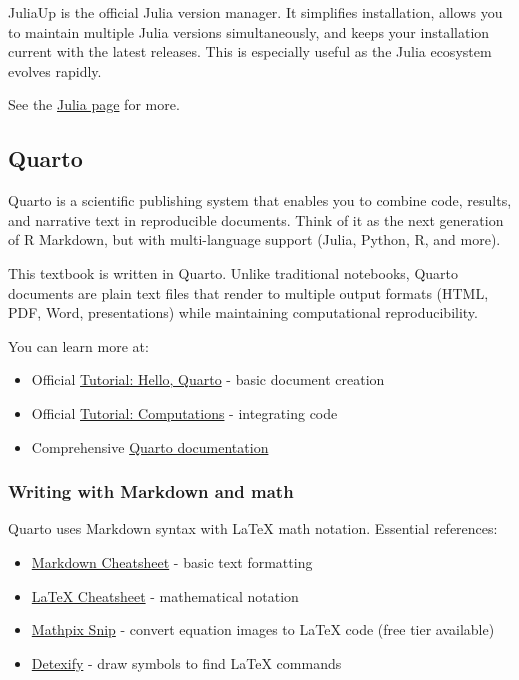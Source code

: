\documentclass[
  letterpaper,
  DIV=11,
  numbers=noendperiod]{scrreprt}
\providecommand{\tightlist}{%
  \setlength{\itemsep}{0pt}\setlength{\parskip}{0pt}}
\begin{document}
JuliaUp is the official Julia version manager. It simplifies
installation, allows you to maintain multiple Julia versions
simultaneously, and keeps your installation current with the latest
releases. This is especially useful as the Julia ecosystem evolves
rapidly.

See the \href{./julia.qmd}{Julia page} for more.

\subsection{Quarto}\label{quarto}

Quarto is a scientific publishing system that enables you to combine
code, results, and narrative text in reproducible documents. Think of it
as the next generation of R Markdown, but with multi-language support
(Julia, Python, R, and more).

This textbook is written in Quarto. Unlike traditional notebooks, Quarto
documents are plain text files that render to multiple output formats
(HTML, PDF, Word, presentations) while maintaining computational
reproducibility.

You can learn more at:

\begin{itemize}
\tightlist
\item
  Official
  \href{https://quarto.org/docs/get-started/hello/vscode.html}{Tutorial:
  Hello, Quarto} - basic document creation
\item
  Official
  \href{https://quarto.org/docs/get-started/computations/vscode.html}{Tutorial:
  Computations} - integrating code
\item
  Comprehensive \href{https://quarto.org/docs/guide/}{Quarto
  documentation}
\end{itemize}

\subsubsection{Writing with Markdown and
math}\label{writing-with-markdown-and-math}

Quarto uses Markdown syntax with LaTeX math notation. Essential
references:

\begin{itemize}
\tightlist
\item
  \href{https://www.markdownguide.org/cheat-sheet/}{Markdown Cheatsheet}
  - basic text formatting
\item
  \href{https://ctan.math.washington.edu/tex-archive/info/undergradmath/undergradmath.pdf}{LaTeX
  Cheatsheet} - mathematical notation
\item
  \href{https://mathpix.com/snip}{Mathpix Snip} - convert equation
  images to LaTeX code (free tier available)
\item
  \href{https://detexify.kirelabs.org/classify.html}{Detexify} - draw
  symbols to find LaTeX commands
\end{itemize}
\end{document}

